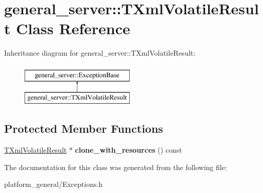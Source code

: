 \hypertarget{classgeneral__server_1_1TXmlVolatileResult}{\section{general\-\_\-server\-:\-:\-T\-Xml\-Volatile\-Result \-Class \-Reference}
\label{classgeneral__server_1_1TXmlVolatileResult}
}
\-Inheritance diagram for general\-\_\-server\-:\-:\-T\-Xml\-Volatile\-Result\-:\begin{figure}[H]
\begin{center}
\leavevmode
\includegraphics[height=2.000000cm]{classgeneral__server_1_1TXmlVolatileResult}
\end{center}
\end{figure}
\subsection*{\-Protected \-Member \-Functions}
\begin{DoxyCompactItemize}
\item 
\hypertarget{classgeneral__server_1_1TXmlVolatileResult_aed5ba5bd82d3d957374886dcbed3a302}{\hyperlink{classgeneral__server_1_1TXmlVolatileResult}{\-T\-Xml\-Volatile\-Result} $\ast$ {\bfseries clone\-\_\-with\-\_\-resources} () const }\label{classgeneral__server_1_1TXmlVolatileResult_aed5ba5bd82d3d957374886dcbed3a302}

\end{DoxyCompactItemize}


\-The documentation for this class was generated from the following file\-:\begin{DoxyCompactItemize}
\item 
platform\-\_\-general/\-Exceptions.\-h\end{DoxyCompactItemize}
